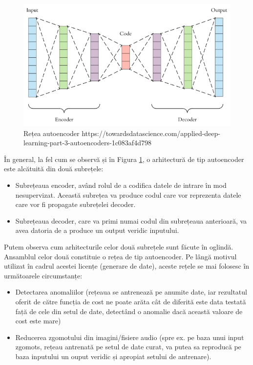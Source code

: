 \documentclass[a4paper,12pt]{report}
\begin{document}
    \begin{figure}[H]
    	\begin{center}
    		\includegraphics[width=\linewidth]{images/autoencoder.PNG}
    	\end{center}
    	\caption{Rețea autoencoder \newline
    		\hspace{\linewidth}https://towardsdatascience.com/applied-deep-learning-part-3-autoencoders-1c083af4d798}
    	\label{fig:autoencoder}
    \end{figure}
    
    În general, la fel cum se observă și în Figura \ref{fig:autoencoder}, o arhitectură de tip autoencoder este alcătuită din două subrețele:
    
    \begin{itemize}
    	\item Subrețeaua encoder, având rolul de a codifica datele de intrare în mod nesupervizat. Această subrețea va produce codul care vor reprezenta datele care vor fi propagate subrețelei decoder.
    	\item Subrețeaua decoder, care va primi numai codul din subrețeaua anterioară, va avea datoria de a produce un output veridic inputului.
    \end{itemize}

	Putem observa cum arhitecturile celor două subrețele sunt făcute în oglindă. Ansamblul celor două constituie o rețea de tip autoencoder. Pe lângă motivul utilizat în cadrul acestei licențe (generare de date), aceste rețele se mai folosesc în următoarele circumstanțe: 
	
	\begin{itemize}
		\item Detectarea anomaliilor (rețeaua se antrenează pe anumite date, iar rezultatul oferit de către funcția de cost ne poate arăta cât de diferită este data testată față de cele din setul de date, detectând o anomalie dacă această valoare de cost este mare)
		\item Reducerea zgomotului din imagini/fisiere audio (spre ex. pe baza unui input zgomots, rețeau antrenată pe setul de date curat, va putea sa reproducă pe baza inputului un ouput veridic și apropiat setului de antrenare).
	\end{itemize}
 
\end{document}
